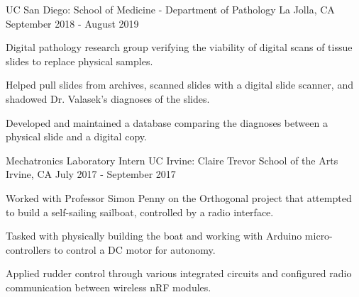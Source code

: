 \begin{cventries}
    {UC San Diego: School of Medicine - Department of Pathology} %
    {La Jolla, CA} %
    {September 2018 - August 2019} %
    {
      \begin{cvitems} %
        \item {Digital pathology research group verifying the viability of digital scans of tissue slides to replace physical samples.}
        \item {Helped pull slides from archives, scanned slides with a digital slide scanner, and shadowed Dr. Valasek’s diagnoses of the slides.}
        \item {Developed and maintained a database comparing the diagnoses between a physical slide and a digital copy.}
      \end{cvitems}
    }
 \cventry
    {Mechatronics Laboratory Intern} %
    {UC Irvine: Claire Trevor School of the Arts} %
    {Irvine, CA} %
    {July 2017 - September 2017} %
    {
      \begin{cvitems} %
        \item {Worked with Professor Simon Penny on the Orthogonal project that attempted to build a self-sailing sailboat, controlled by a radio interface.}
        \item {Tasked with physically building the boat and working with Arduino micro-controllers to control a DC motor for autonomy.}
        \item {Applied rudder control through various integrated circuits and configured radio communication between wireless nRF modules.}
      \end{cvitems}
    }
\end{cventries}

